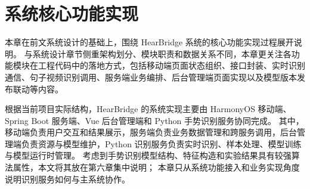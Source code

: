 \chapter{系统核心功能实现}

本章在前文系统设计的基础上，围绕 HearBridge 系统的核心功能实现过程展开说明。
与系统设计章节侧重架构划分、模块职责和数据关系不同，本章更关注各功能模块在工程代码中的落地方式，包括移动端页面状态组织、接口封装、实时识别通信、句子视频识别调用、服务端业务编排、后台管理端页面实现以及模型版本发布联动等内容。

根据当前项目实际结构，HearBridge 的系统实现主要由 HarmonyOS 移动端、Spring Boot 服务端、Vue 后台管理端和 Python 手势识别服务协同完成。
其中，移动端负责用户交互和结果展示，服务端负责业务数据管理和跨服务调用，后台管理端负责资源与模型维护，Python 识别服务负责实时识别、样本处理、模型训练与模型运行时管理。
考虑到手势识别模型结构、特征构造和实验结果具有较强算法属性，本文将其放在第六章集中说明；
本章只从系统功能接入和业务实现角度说明识别服务如何与主系统协作。







